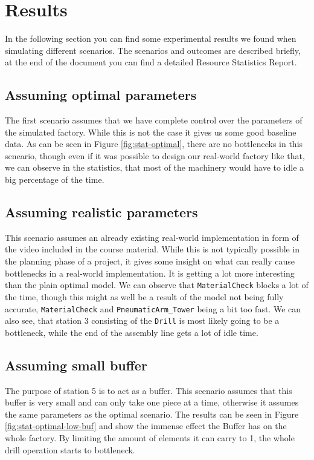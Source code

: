 \documentclass{report}
\begin{document}
\section{Results}
In the following section you can find some experimental results we found when simulating different scenarios. The scenarios and outcomes are described briefly, at the end of the document you can find a detailed Resource Statistics Report. 
\subsection{Assuming optimal parameters}
The first scenario assumes that we have complete control over the parameters of the simulated factory. 
While this is not the case it gives us some good baseline data. As can be seen in Figure \ref{fig:stat-optimal}, 
there are no bottlenecks in this scneario, though even if it was possible to design our real-world factory like that, 
we can observe in the statistics, that most of the machinery would have to idle a big percentage of the time.

\subsection{Assuming realistic parameters}
This scenario assumes an already existing real-world implementation in form of the video included in the course material.
While this is not typically possible in the planning phase of a project, it gives some insight on what can really cause 
bottlenecks in a real-world implementation. It is getting a lot more interesting than the plain optimal model. 
We can observe that \texttt{MaterialCheck} blocks a lot of the time, though this might as well be a result of the model not being fully accurate, 
\texttt{MaterialCheck} and \texttt{PneumaticArm\_Tower} being a bit too fast. We can also see, that station 3 consisting of the \texttt{Drill} 
is most likely going to be a bottleneck, while the end of the assembly line gets a lot of idle time.

\subsection{Assuming small buffer}
The purpose of station 5 is to act as a buffer. 
This scenario assumes that this buffer is very small and can only take one piece at a time, 
otherwise it assumes the same parameters as the optimal scenario. The results can be seen in Figure \ref{fig:stat-optimal-low-buf} and
show the immense effect the Buffer has on the whole factory. By limiting the amount of elements it can carry to 1, 
the whole drill operation starts to bottleneck.
\end{document}
